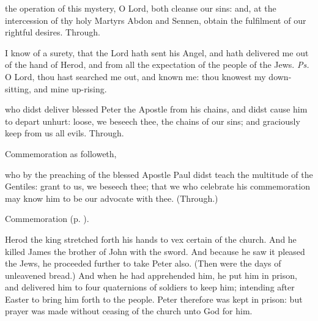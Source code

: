 \postcommunion
{} the operation of this mystery, O Lord, both cleanse our sins: and, at the intercession of thy holy Martyrs Abdon and Sennen, obtain the fulfilment of our rightful desires. Through.



\introit
{} I know of a surety, that the Lord hath sent his Angel, and hath delivered me out of the hand of Herod, and from all the expectation of the people of the Jews. \textit{Ps.} O Lord, thou hast searched me out, and known me: thou knowest my down-sitting, and mine up-rising.


\collect
{} who didst deliver blessed Peter the Apostle from his chains, and didst cause him to depart unhurt: loose, we beseech thee, the chains of our sins; and graciously keep from us all evils. Through.

\begin{rubric}
	 Commemoration  as followeth,
\end{rubric}
 who by the preaching of the blessed Apostle Paul didst teach the multitude of the Gentiles: grant to us, we beseech thee; that we who celebrate his commemoration may know him to be our advocate with thee. (Through.)

\begin{rubric}
	 Commemoration  (p. \pageref{HolyMaccabeesCollect}).
\end{rubric}

 Herod the king stretched forth his hands to vex certain of the church. And he killed James the brother of John with the sword. And because he saw it pleased the Jews, he proceeded further to take Peter also. (Then were the days of unleavened bread.) And when he had apprehended him, he put him in prison, and delivered him to four quaternions of soldiers to keep him; intending after Easter to bring him forth to the people. Peter therefore was kept in prison: but prayer was made without ceasing of the church unto God for him.

